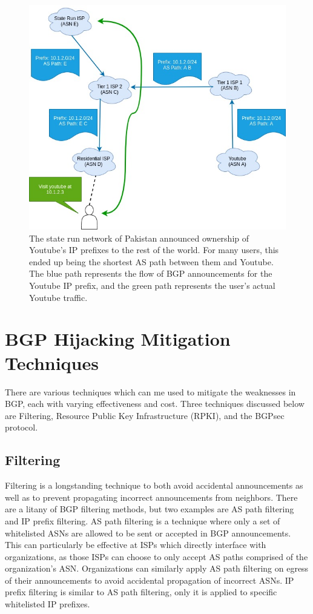 \documentclass[conference]{IEEEtran}
\begin{document}
\begin{figure}
  \includegraphics[width=\linewidth]{images/bgp-hijack.jpg}
  \caption{The state run network of Pakistan announced ownership of Youtube's IP prefixes to the rest of the world.  For many users, this ended up being the shortest AS path between them and Youtube.  The blue path represents the flow of BGP announcements for the Youtube IP prefix, and the green path represents the user's actual Youtube traffic.}
  \label{fig:bgp-hijack}
\end{figure}

\section{BGP Hijacking Mitigation Techniques}
There are various techniques which can me used to mitigate the weaknesses in BGP, each with varying effectiveness and cost.  Three techniques discussed below are Filtering, Resource Public Key Infrastructure (RPKI), and the BGPsec protocol.

\subsection{Filtering}
Filtering is a longstanding technique to both avoid accidental announcements as well as to prevent propagating incorrect announcements from neighbors.  There are a litany of BGP filtering methods, but two examples are AS path filtering and IP prefix filtering.  AS path filtering is a technique where only a set of whitelisted ASNs are allowed to be sent or accepted in BGP announcements.  This can particularly be effective at ISPs which directly interface with organizations, as those ISPs can choose to only accept AS paths comprised of the organization's ASN.  Organizations can similarly apply AS path filtering on egress of their announcements to avoid accidental propagation of incorrect ASNs.  IP prefix filtering is similar to AS path filtering, only it is applied to specific whitelisted IP prefixes.
\end{document}
